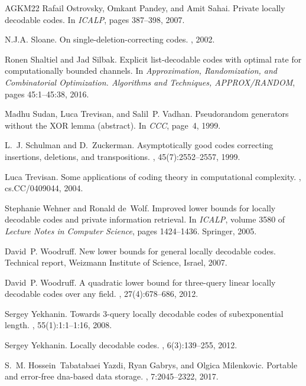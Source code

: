 \documentclass[10pt,a4paper]{article}
\theoremstyle{remark}
\begin{document}
\begin{thebibliography}{AGKM22}
Rafail Ostrovsky, Omkant Pandey, and Amit Sahai.
\newblock Private locally decodable codes.
\newblock In {\em {ICALP}}, pages 387--398, 2007.

N.J.A. Sloane.
\newblock On single-deletion-correcting codes.
, 2002.

Ronen Shaltiel and Jad Silbak.
\newblock Explicit list-decodable codes with optimal rate for computationally
  bounded channels.
\newblock In {\em Approximation, Randomization, and Combinatorial Optimization.
  Algorithms and Techniques, {APPROX/RANDOM}}, pages 45:1--45:38, 2016.

Madhu Sudan, Luca Trevisan, and Salil~P. Vadhan.
\newblock Pseudorandom generators without the {XOR} lemma (abstract).
\newblock In {\em {CCC}}, page~4, 1999.

L.~J. {Schulman} and D.~{Zuckerman}.
\newblock Asymptotically good codes correcting insertions, deletions, and
  transpositions.
, 45(7):2552--2557,
  1999.

Luca Trevisan.
\newblock Some applications of coding theory in computational complexity.
, cs.CC/0409044, 2004.

Stephanie Wehner and Ronald de~Wolf.
\newblock Improved lower bounds for locally decodable codes and private
  information retrieval.
\newblock In {\em {ICALP}}, volume 3580 of {\em Lecture Notes in Computer
  Science}, pages 1424--1436. Springer, 2005.

David~P. Woodruff.
\newblock New lower bounds for general locally decodable codes.
\newblock Technical report, Weizmann Institute of Science, Israel, 2007.

David~P. Woodruff.
\newblock A quadratic lower bound for three-query linear locally decodable
  codes over any field.
, 27(4):678--686, 2012.

Sergey Yekhanin.
\newblock Towards 3-query locally decodable codes of subexponential length.
, 55(1):1:1--1:16, 2008.

Sergey Yekhanin.
\newblock Locally decodable codes.
,
  6(3):139--255, 2012.

S.~M. Hossein~Tabatabaei Yazdi, Ryan Gabrys, and Olgica Milenkovic.
\newblock Portable and error-free dna-based data storage.
, 7:2045--2322, 2017.

\end{thebibliography}
\end{document}
